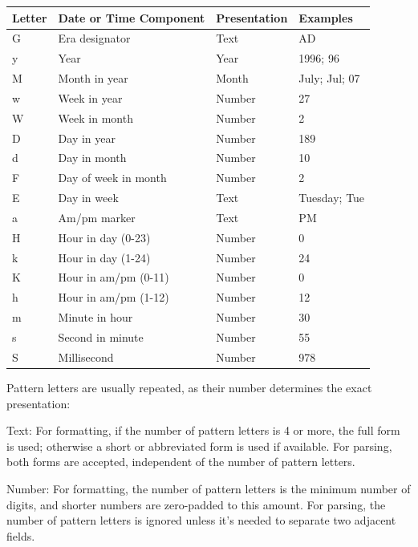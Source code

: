         \begin{tabular}{| l | l | l | l |}
        \hline
        Letter	&Date or Time Component	&Presentation	&Examples \\
        \hline \hline
        G	&Era designator	       &Text	       &AD   \\ \hline
        y	&Year	               &Year           &1996; 96   \\ \hline
        M	&Month in year	       &Month          &July; Jul; 07   \\ \hline
        w	&Week in year	       &Number         &27   \\ \hline
        W	&Week in month	       &Number         &2   \\ \hline
        D	&Day in year	       &Number         &189   \\ \hline
        d	&Day in month	       &Number         &10   \\ \hline
        F	&Day of week in month  &Number         &2   \\ \hline
        E	&Day in week	       &Text           &Tuesday; Tue   \\ \hline
        a	&Am/pm marker	       &Text           &PM   \\ \hline
        H	&Hour in day (0-23)    &Number         &0   \\ \hline
        k	&Hour in day (1-24)    &Number         &24   \\ \hline
        K	&Hour in am/pm (0-11)  &Number         &0   \\ \hline
        h	&Hour in am/pm (1-12)  &Number         &12   \\ \hline
        m	&Minute in hour	       &Number         &30   \\ \hline
        s	&Second in minute      &Number         &55   \\ \hline
        S	&Millisecond	       &Number         &978   \\ \hline
        \end{tabular}

        Pattern letters are usually repeated, as their number determines the
        exact presentation:

        Text: For formatting, if the number of pattern letters is 4 or more, the
        full form is used; otherwise a short or abbreviated form is used if
        available. For parsing, both forms are accepted, independent of the
        number of pattern letters.

        Number: For formatting, the number of pattern letters is the minimum
        number of digits, and shorter numbers are zero-padded to this amount.
        For parsing, the number of pattern letters is ignored unless it's needed
        to separate two adjacent fields.

